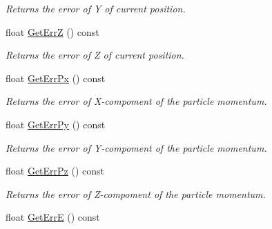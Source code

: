 \begin{DoxyCompactItemize}
\begin{DoxyCompactList}\small\item\em Returns the error of Y of current position. \end{DoxyCompactList}\item 
float \hyperlink{classKFParticle_ae1b33148a5b3bedff0ee24bacd73c9be}{Get\+ErrZ} () const \hypertarget{classKFParticle_ae1b33148a5b3bedff0ee24bacd73c9be}{}\label{classKFParticle_ae1b33148a5b3bedff0ee24bacd73c9be}

\begin{DoxyCompactList}\small\item\em Returns the error of Z of current position. \end{DoxyCompactList}\item 
float \hyperlink{classKFParticle_a658b4dc249b9d92c512183ab95f721ec}{Get\+Err\+Px} () const \hypertarget{classKFParticle_a658b4dc249b9d92c512183ab95f721ec}{}\label{classKFParticle_a658b4dc249b9d92c512183ab95f721ec}

\begin{DoxyCompactList}\small\item\em Returns the error of X-\/compoment of the particle momentum. \end{DoxyCompactList}\item 
float \hyperlink{classKFParticle_a49b8aff03c03c33d21e09c935f3839ae}{Get\+Err\+Py} () const \hypertarget{classKFParticle_a49b8aff03c03c33d21e09c935f3839ae}{}\label{classKFParticle_a49b8aff03c03c33d21e09c935f3839ae}

\begin{DoxyCompactList}\small\item\em Returns the error of Y-\/compoment of the particle momentum. \end{DoxyCompactList}\item 
float \hyperlink{classKFParticle_a91247862b37bb70805249fcb59f86f3a}{Get\+Err\+Pz} () const \hypertarget{classKFParticle_a91247862b37bb70805249fcb59f86f3a}{}\label{classKFParticle_a91247862b37bb70805249fcb59f86f3a}

\begin{DoxyCompactList}\small\item\em Returns the error of Z-\/compoment of the particle momentum. \end{DoxyCompactList}\item 
float \hyperlink{classKFParticle_a8ffaa29ff6ec0f700768fd28088c3d04}{Get\+ErrE} () const \hypertarget{classKFParticle_a8ffaa29ff6ec0f700768fd28088c3d04}{}\label{classKFParticle_a8ffaa29ff6ec0f700768fd28088c3d04}


\end{DoxyCompactItemize}
